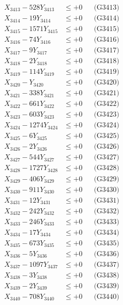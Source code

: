 \documentclass[a4paper,10pt]{article}
\begin{document}
{\begin{align}
X_{3413} - 528Y_{3413} &\leq +0 && \text{(G3413)} \\
X_{3414} - 19Y_{3414} &\leq +0 && \text{(G3414)} \\
X_{3415} - 1571Y_{3415} &\leq +0 && \text{(G3415)} \\
X_{3416} - 74Y_{3416} &\leq +0 && \text{(G3416)} \\
X_{3417} - 9Y_{3417} &\leq +0 && \text{(G3417)} \\
X_{3418} - 2Y_{3418} &\leq +0 && \text{(G3418)} \\
X_{3419} - 114Y_{3419} &\leq +0 && \text{(G3419)} \\
X_{3420} - Y_{3420} &\leq +0 && \text{(G3420)} \\
\allowbreak
X_{3421} - 338Y_{3421} &\leq +0 && \text{(G3421)} \\
X_{3422} - 661Y_{3422} &\leq +0 && \text{(G3422)} \\
X_{3423} - 603Y_{3423} &\leq +0 && \text{(G3423)} \\
X_{3424} - 1274Y_{3424} &\leq +0 && \text{(G3424)} \\
X_{3425} - 6Y_{3425} &\leq +0 && \text{(G3425)} \\
X_{3426} - 2Y_{3426} &\leq +0 && \text{(G3426)} \\
X_{3427} - 544Y_{3427} &\leq +0 && \text{(G3427)} \\
X_{3428} - 1727Y_{3428} &\leq +0 && \text{(G3428)} \\
X_{3429} - 406Y_{3429} &\leq +0 && \text{(G3429)} \\
X_{3430} - 911Y_{3430} &\leq +0 && \text{(G3430)} \\
\allowbreak
X_{3431} - 12Y_{3431} &\leq +0 && \text{(G3431)} \\
X_{3432} - 242Y_{3432} &\leq +0 && \text{(G3432)} \\
X_{3433} - 246Y_{3433} &\leq +0 && \text{(G3433)} \\
X_{3434} - 17Y_{3434} &\leq +0 && \text{(G3434)} \\
X_{3435} - 673Y_{3435} &\leq +0 && \text{(G3435)} \\
X_{3436} - 5Y_{3436} &\leq +0 && \text{(G3436)} \\
X_{3437} - 1097Y_{3437} &\leq +0 && \text{(G3437)} \\
X_{3438} - 3Y_{3438} &\leq +0 && \text{(G3438)} \\
X_{3439} - 2Y_{3439} &\leq +0 && \text{(G3439)} \\
X_{3440} - 708Y_{3440} &\leq +0 && \text{(G3440)} \\

\end{align}}
\end{document}
